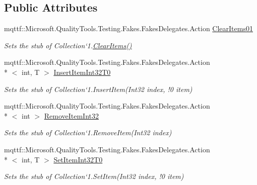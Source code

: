 \subsection*{Public Attributes}
\begin{DoxyCompactItemize}
\item 
mqttf\-::\-Microsoft.\-Quality\-Tools.\-Testing.\-Fakes.\-Fakes\-Delegates.\-Action \hyperlink{class_system_1_1_collections_1_1_object_model_1_1_fakes_1_1_stub_collection_3_01_t_01_4_a28bba86ac8083465598c4743e8ddb343}{Clear\-Items01}
\begin{DoxyCompactList}\small\item\em Sets the stub of Collection`1.\hyperlink{class_system_1_1_collections_1_1_object_model_1_1_fakes_1_1_stub_collection_3_01_t_01_4_a87e7346e9e447dfaadf5b248f3077962}{Clear\-Items()}\end{DoxyCompactList}\item 
mqttf\-::\-Microsoft.\-Quality\-Tools.\-Testing.\-Fakes.\-Fakes\-Delegates.\-Action\\*
$<$ int, T $>$ \hyperlink{class_system_1_1_collections_1_1_object_model_1_1_fakes_1_1_stub_collection_3_01_t_01_4_a9023c200337e1f0dff114b9b90b5a16a}{Insert\-Item\-Int32\-T0}
\begin{DoxyCompactList}\small\item\em Sets the stub of Collection`1.Insert\-Item(Int32 index, !0 item)\end{DoxyCompactList}\item 
mqttf\-::\-Microsoft.\-Quality\-Tools.\-Testing.\-Fakes.\-Fakes\-Delegates.\-Action\\*
$<$ int $>$ \hyperlink{class_system_1_1_collections_1_1_object_model_1_1_fakes_1_1_stub_collection_3_01_t_01_4_ac8dee38f68e104bc3a81ec53ae782554}{Remove\-Item\-Int32}
\begin{DoxyCompactList}\small\item\em Sets the stub of Collection`1.Remove\-Item(\-Int32 index)\end{DoxyCompactList}\item 
mqttf\-::\-Microsoft.\-Quality\-Tools.\-Testing.\-Fakes.\-Fakes\-Delegates.\-Action\\*
$<$ int, T $>$ \hyperlink{class_system_1_1_collections_1_1_object_model_1_1_fakes_1_1_stub_collection_3_01_t_01_4_aaf30045a1c3d531a9d08ecd6fcde0e95}{Set\-Item\-Int32\-T0}
\begin{DoxyCompactList}\small\item\em Sets the stub of Collection`1.Set\-Item(Int32 index, !0 item)\end{DoxyCompactList}\end{DoxyCompactItemize}
